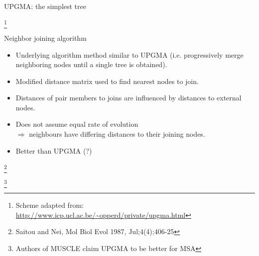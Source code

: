 \documentclass[pdf]{beamer}
\newcommand\blfootnote[1]{%
  \begingroup  %
  \renewcommand\thefootnote{}\footnote{#1}%
  \addtocounter{footnote}{-1}  %
  \endgroup
}
\begin{document}
\begin{frame}{UPGMA: the simplest tree}
\begin{figure}[ht]
 \end{figure}
  \blfootnote{Scheme adapted from:\\
    \url{http://www.icp.ucl.ac.be/~opperd/private/upgma.html}
  }
\end{frame}

\begin{frame}{Neighbor joining algorithm}
  \begin{itemize}
  \item Underlying algorithm method similar to UPGMA (i.e. progressively merge
    neighboring nodes until a single tree is obtained).
  \item Modified distance matrix used to find nearest nodes to join.
  \item Distances of pair members to joins are influenced by distances to external nodes.
  \item Does not assume equal rate of evolution\\ $\Rightarrow$ neighbours have
    differing distances to their joining nodes.
  \item Better than UPGMA (?)
  \end{itemize}
  \blfootnote{Saitou and Nei, Mol Biol Evol 1987, Jul;4(4);406-25}
  \blfootnote{Authors of MUSCLE claim UPGMA to be better for MSA}
\end{frame}
\end{document}
